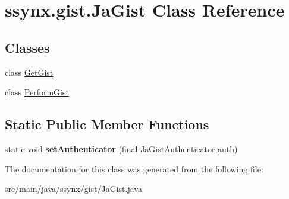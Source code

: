 \hypertarget{classssynx_1_1gist_1_1JaGist}{}\section{ssynx.\+gist.\+Ja\+Gist Class Reference}
\label{classssynx_1_1gist_1_1JaGist}
\subsection*{Classes}
\begin{DoxyCompactItemize}
\item 
class \hyperlink{classssynx_1_1gist_1_1JaGist_1_1GetGist}{Get\+Gist}
\item 
class \hyperlink{classssynx_1_1gist_1_1JaGist_1_1PerformGist}{Perform\+Gist}
\end{DoxyCompactItemize}
\subsection*{Static Public Member Functions}
\begin{DoxyCompactItemize}
\item 
\mbox{\label{classssynx_1_1gist_1_1JaGist_a3e97465960b8cec6a453035b4fcc67b4}} 
static void {\bfseries set\+Authenticator} (final \hyperlink{classssynx_1_1gist_1_1JaGistAuthenticator}{Ja\+Gist\+Authenticator} auth)
\end{DoxyCompactItemize}


The documentation for this class was generated from the following file\+:\begin{DoxyCompactItemize}
\item 
src/main/java/ssynx/gist/Ja\+Gist.\+java\end{DoxyCompactItemize}
